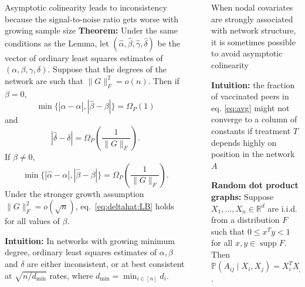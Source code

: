 \documentclass[final]{beamer}
\newcommand{\R}{\mathbb{R}}
\newcommand{\alphahat}{\hat{\alpha}}
\newcommand{\gammahat}{\hat{\gamma}}
\newcommand{\deltahat}{\hat{\delta}}
\newcommand{\betahat}{\hat{\beta}}
\DeclareMathOperator*{\supp}{supp}
\newcommand \Omegap [1] {\Omega_P \left(#1\right)}
\newlength{\sepwidth}
\newlength{\colwidth}
\newcommand{\separatorcolumn}{\begin{column}{\sepwidth}\end{column}}
\begin{document}
\begin{frame}[t]
\begin{columns}[t]
\begin{column}{\colwidth}
\begin{block}{Asymptotic colinearity leads to inconsistency because the signal-to-noise ratio gets worse with growing sample size}
                \textbf{Theorem:} Under the same conditions as the Lemma, let $(\alphahat, \betahat, \gammahat, \deltahat)$ be the vector of ordinary least squares estimates of $(\alpha, \beta, \gamma, \delta)$. Suppose that the degrees of the network are such that $\| G \|_F^2 = o(n)$.
                Then if $\beta = 0$,
                \begin{equation*}
                    \min\{ |\alphahat-\alpha|, |\betahat-\beta| \}
                    = \Omegap{ 1 }
                \end{equation*}
                and
                \begin{equation} \label{eq:deltahat:LB}
                    | \deltahat - \delta | = \Omegap{ \frac{1}{\|G\|_F} }.
                \end{equation}
                If $\beta \neq 0$,
                \begin{equation*}
                    \min\{ |\alphahat-\alpha|, |\betahat-\beta| \}
                    = \Omegap{ \frac{1}{\|G\|_F} }.
                \end{equation*}
                Under the stronger growth assumption $\|G\|_F^2 = o( \sqrt{n} )$, eq.~\eqref{eq:deltahat:LB} holds for all values of $\beta$.
                \vspace{3mm}

                \textbf{Intuition:} In networks with growing minimum degree, ordinary least squares estimates of $\alpha, \beta$ and $\delta$ are either inconsistent, or at best consistent at $\sqrt{n / d_\mathrm{min}}$ rates, where $d_\mathrm{min} = \min_{i \in [n]} d_i$.
            \end{block}
        \end{column}

        \separatorcolumn

        \begin{column}{\colwidth}
            \begin{block}{When nodal covariates are strongly associated with network structure, it is sometimes possible to avoid asymptotic colinearity}

                \textbf{Intuition:} the fraction of vaccinated peers in eq. \eqref{eq:avg} might not converge to a column of constants if treatment $T$ depends highly on position in the network $A$

                \textbf{Random dot product graphs:} Suppose $X_1, ..., X_n \in \R^d$ are i.i.d. from a distribution $F$ such that $0 \le x^T y < 1$ for all $x,y \in \supp F$. Then $\mathbb{P}(A_{ij} \mid X_i, X_j) = X_i^T X_j$.


\end{block}
\end{column}
\end{columns}
\end{frame}
\end{document}
